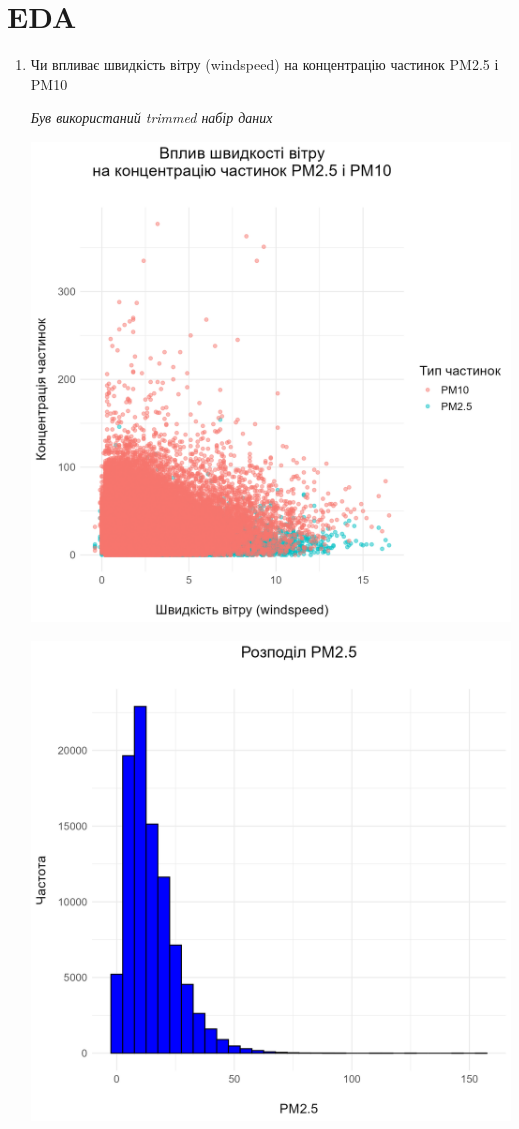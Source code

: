 \documentclass[./report.tex]{subfiles}
\begin{document}
\section{EDA}

\begin{enumerate}
  \item Чи впливає швидкість вітру (windspeed) на концентрацію частинок PM2.5 і PM10

  \quad \textit{Був використаний trimmed набір даних}

  \includegraphics[width=\linewidth]{plots/question1/wind_speed_vs_pm.png}

  \pagebreak

  \includegraphics[width=\linewidth]{plots/question1/pm2_5_gist.png}


\end{enumerate}
\end{document}
